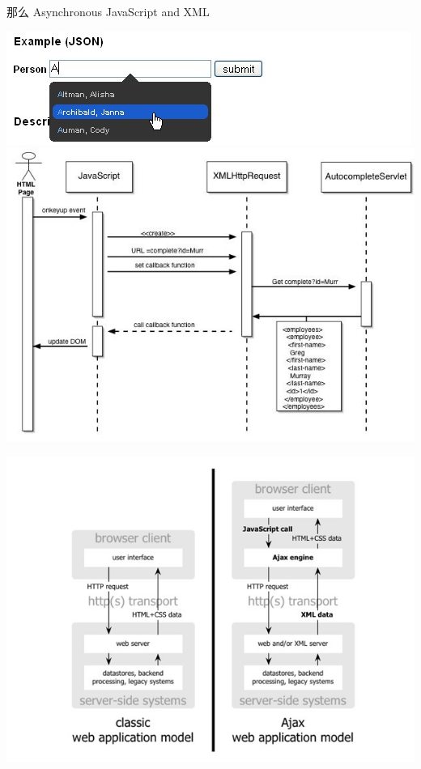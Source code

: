 \documentclass{beamer}
\newcommand{\fullPageImage}[2]{
	{
		\usebackgroundtemplate{\texttt{[image: \#1]}}
		\frame[plain]{#2}
	}
}
\begin{document}
\begin{frame}[plain]
	那么 Asynchronous JavaScript and XML\\
	\begin{center}
	\includegraphics[width=.6\textwidth]{images/ajax-javascript-scripts-10.jpg}\\
	\includegraphics[width=.6\textwidth]{images/autocomplete-sequence.jpg}\\
	\end{center}
\end{frame}

\fullPageImage{images/interaction-overview-example-online-shopping.jpg}{}
\fullPageImage{images/interaction-overview-example-ajax-comments.jpg}{}


\begin{frame}[plain]
	\begin{center}
	\includegraphics[width=\textwidth]{images/ajax-fig1-small.jpg}
	\end{center}
\end{frame}
\end{document}
